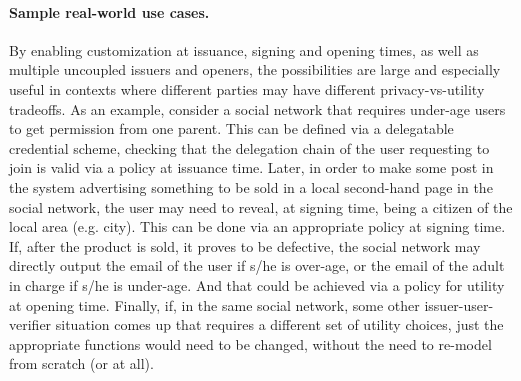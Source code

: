 \paragraph{Sample real-world use cases.} %
By enabling customization at issuance, signing and opening times, as well as
multiple uncoupled issuers and openers, the possibilities are large and
especially useful in contexts where different parties may have different
privacy-vs-utility tradeoffs. As an example, consider a social network that
requires under-age users to get permission from one parent. This can be defined
via a delegatable credential scheme, checking that the delegation chain of the
user requesting to join is valid via a policy at issuance time. Later, in order
to make some post in the system advertising something to be sold in a local
second-hand page in the social network, the user may need to reveal, at signing
time, being a citizen of the local area (e.g. city). This can be done via an
appropriate policy at signing time. If, after the product is sold, it proves
to be defective, the social network may directly output the email of the user
if s/he is over-age, or the email of the adult in charge if s/he is under-age.
And that could be achieved via a policy for utility at opening time. Finally,
if, in the same social network, some other
issuer-user-verifier situation comes up that requires a different set of utility
choices, just the appropriate functions would need to be changed, without the
need to re-model from scratch (or at all).



